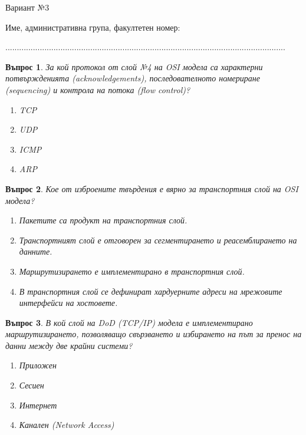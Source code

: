\documentclass[11pt]{scrartcl}
\newtheorem{q}{Въпрос}
\newenvironment{defractors}{
\begin{enumerate}
  \setlength{\itemsep}{1pt}
  \setlength{\parskip}{0pt}
  \setlength{\parsep}{0pt}
}{\end{enumerate}}
\begin{document}
\title{}
\subtitle{\textrm{Вариант 3}}
\author{}
\date{}

\begin{center}
  Вариант №3
\end{center}

\begin{center}
Име, административна група, факултетен номер:

\end{center}

\begin{center}
..........................................................................................................................
\end{center}

\begin{q}
  За кой протокол от слой №4 на OSI модела са характерни потвържденията
  (ack\-now\-ledgements), последователното номериране (sequencing) и контрола на
  потока (flow control)?

  \begin{defractors}
  \item TCP
  \item UDP
  \item ICMP
  \item ARP
  \end{defractors}
\end{q}

\begin{q}
  Кое от изброените твърдения е вярно за транспортния слой на OSI модела?

  \begin{defractors}
    \item Пакетите са продукт на транспортния слой.
    \item Транспортният слой е отговорен за сегментирането и реасемблирането на данните.
    \item Маршрутизирането е имплементирано в транспортния слой.
    \item В транспортния слой се дефинират хардуерните адреси на мрежовите интерфейси на хостовете.
  \end{defractors}
\end{q}

\begin{q}
  В кой слой на DoD (TCP/IP) модела е имплементирано маршрутизирането,
  позволяващо свързването и избирането на път за пренос на данни между две
  крайни системи?

  \begin{defractors}
  \item Приложен
  \item Сесиен
  \item Интернет
  \item Канален (Network Access)
  \end{defractors}
\end{q}
\end{document}
